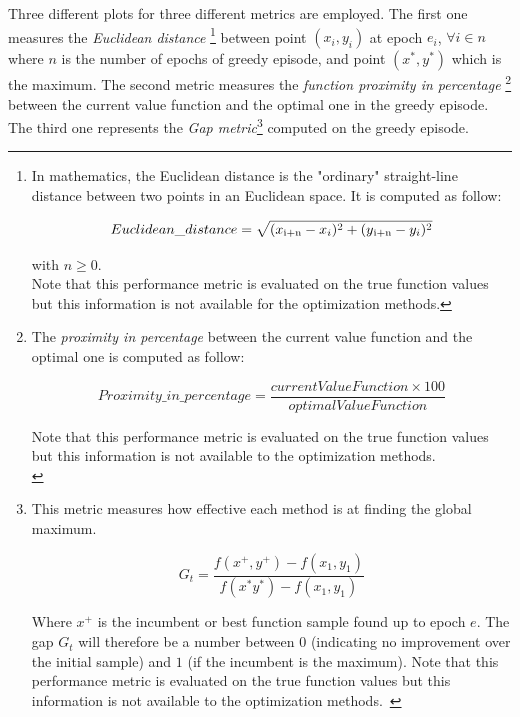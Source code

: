 Three different plots for three different metrics are employed. The first one measures the \textit{Euclidean distance} \footnote{In mathematics, the Euclidean distance is the "ordinary" straight-line distance between two points in an Euclidean space. It is computed as follow: 
	
	\begin{equation}
		Euclidean\_distance = \sqrt{(x\textsubscript{i+n} - x_i)^2 + (y\textsubscript{i+n} - y_i)^2}
	\end{equation}

with $n \ge 0$. \\
	
Note that this performance metric is evaluated on the true function values but this information is not available for the optimization methods.} between point $(x_i, y_i)$ at epoch $e_i$, $\forall i \in n$ where $n$ is the number of epochs of greedy episode, and point $(x^*, y^*)$ which is the maximum. The second metric measures the \textit{function proximity in percentage} \footnote{The \textit{proximity in percentage} between the current value function and the optimal one is computed as follow:

\begin{equation}
Proximity\_in\_ percentage = \frac{currentValueFunction \times 100}{optimalValueFunction}
\end{equation}

Note that this performance metric is evaluated on the true function values but this information is not available to the optimization methods. \\ } between the current value function and the optimal one in the greedy episode. The third one represents the \textit{Gap metric}\footnote{This metric measures how effective each method is at finding the global maximum.

\begin{equation}
G_t = \dfrac{f(x^+, y^+) - f(x_1, y_1)}{f(x^* y^*) - f(x_1, y_1)}
\end{equation}

Where $x^+$ is the incumbent or best function sample found up to epoch $e$. The gap $G_t$ will therefore be a number between $0$ (indicating no improvement over the initial sample) and $1$ (if the incumbent is the maximum). Note that this performance metric is evaluated on the true function values but this information is not available to the optimization methods.~\cite{Hoffman:2011:PAB:3020548.3020587}} computed on the greedy episode. \\

